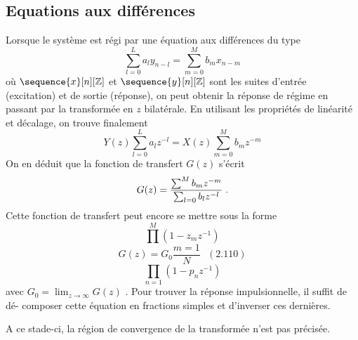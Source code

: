 \subsection{Equations aux diff\'{e}rences}
Lorsque le syst\`{e}me est r\'{e}gi par une \'{e}quation aux diff\'{e}rences du type
$$
\sum_{l=0}^{L}a_{l}y_{n-l}=\sum_{m=0}^{M}b_{m}x_{n-m}
$$
o\`{u} $\sequence{x}[n][\zset]$ et $\sequence{y}[n][\zset]$ sont les suites d'entr\'{e}e (excitation) et de sortie (r\'{e}ponse), on peut obtenir la r\'{e}ponse de r\'{e}gime en passant par la transform\'{e}e en $z$ bilat\'{e}rale. En utilisant les propri\'{e}t\'{e}s de lin\'{e}arit\'{e} et d\'{e}calage, on trouve finalement
\begin{equation}
\label{eq:tz-equation-difference}
Y(z)\sum_{l=0}^{L}a_{l}z^{-l}=X(z)\sum_{m=0}^{M}b_{m}z^{-m}
\end{equation}
On en d\'{e}duit que la fonction de transfert $G(z)$ s'\'{e}crit
$$
G(z)=\frac{\sum^{M}b_{m}z^{-m}}{\sum_{l=0}b_{l}z^{-l}} \;.
$$
Cette fonction de transfert peut encore se mettre sous la forme
$$
\prod^{M}(1-z_{m}z^{-1})
$$
$$
G(z)=G_{0}\frac{m=1}{N}\text{   }(2.110)
$$
$$
\prod_{n=1}(1-p_{n}z^{-1})
$$
avec $G_{0}=\displaystyle \lim_{z\rightarrow\infty}G(z)$ . Pour trouver la r\'{e}ponse impulsionnelle, il suffit de d\'{e}- composer cette \'{e}quation en fractions simples et d'inverser ces derni\`{e}res.

A ce stade-ci, la r\'{e}gion de convergence de la transform\'{e}e n'est pas pr\'{e}cis\'{e}e.


